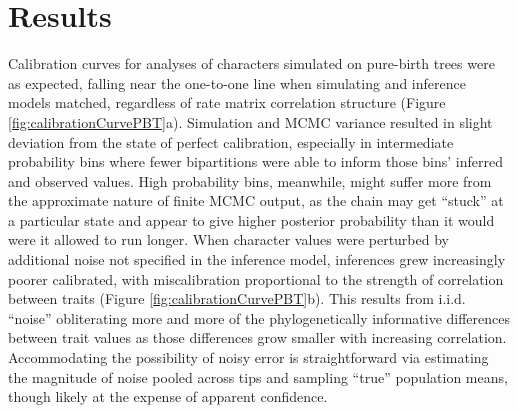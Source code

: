 \documentclass[10pt, twocolumn, twoside]{article}
\begin{document}
\clearpage


\section{Results}


Calibration curves for analyses of characters simulated on pure-birth trees were as expected, falling near the one-to-one line when simulating and inference models matched, regardless of rate matrix correlation structure (Figure \ref{fig:calibrationCurvePBT}a). Simulation and MCMC variance resulted in slight deviation from the state of perfect calibration, especially in intermediate probability bins where fewer bipartitions were able to inform those bins’ inferred and observed values. High probability bins, meanwhile, might suffer more from the approximate nature of finite MCMC output, as the chain may get “stuck” at a particular state and appear to give higher posterior probability than it would were it allowed to run longer. When character values were perturbed by additional noise not specified in the inference model, inferences grew increasingly poorer calibrated, with miscalibration proportional to the strength of correlation between traits (Figure \ref{fig:calibrationCurvePBT}b). This results from i.i.d. “noise” obliterating more and more of the phylogenetically informative differences between trait values as those differences grow smaller with increasing correlation. Accommodating the possibility of noisy error is straightforward via estimating the magnitude of noise pooled across tips and sampling “true” population means, though likely at the expense of apparent confidence.
\end{document}
